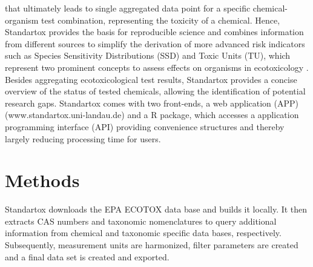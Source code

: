 \documentclass[10pt, a4paper, english]{article}
\begin{document}
that ultimately leads to single aggregated data point for a specific chemical-organism test combination, representing the toxicity of a chemical. Hence, Standartox provides the basis for reproducible science and combines information from different sources to simplify the derivation of more advanced risk indicators such as Species Sensitivity Distributions (SSD) and Toxic Units (TU), which represent two prominent concepts to assess effects on organisms in ecotoxicology \citep{posthuma_species_2002, kefford_definition_2011}. Besides aggregating ecotoxicological test results, Standartox provides a concise overview of the status of tested chemicals, allowing the identification of potential research gaps. Standartox comes with two front-ends, a web application (APP) (www.standartox.uni-landau.de) and a R package, which accesses a application programming interface (API) providing convenience structures and thereby largely reducing processing time for users.

\section{Methods}
Standartox downloads the EPA ECOTOX data base and builds it locally. It then extracts CAS numbers and taxonomic nomenclatures to query additional information from chemical and taxonomic specific data bases, respectively. Subsequently, measurement units are harmonized, filter parameters are created and a final data set is created and exported.
\end{document}
